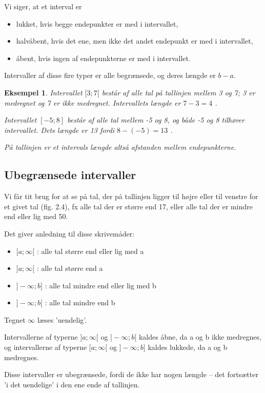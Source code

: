 \documentclass[12pt,oneside,a4paper]{article}
\newtheorem{eks}[thm]{Eksempel}
\begin{document}
Vi siger, at et interval er
\begin{itemize}
    \item lukket, hvis begge endepunkter er med i intervallet,
    \item halvåbent, hvis det ene, men ikke det andet endepunkt er med i intervallet,
    \item åbent, hvis ingen af endepunkterne er med i intervallet.
\end{itemize}
Intervaller af disse fire typer er alle begrænsede, og deres længde er $b-a$.

\begin{eks}
Intervallet $[3;7[$ består af alle tal på tallinjen mellem 3 og 7; 3 er
medregnet og 7 er ikke medregnet. Intervallets længde er $7-3 = 4$ .

Intervallet $[-5;8]$ består af alle tal mellem -5 og 8, og både -5 og 8
tilhører intervallet. Dets længde er 13 fordi $8 - (-5) = 13$ .

På tallinjen er et intervals længde altså afstanden mellem endepunkterne.
\end{eks}

\subsection{Ubegrænsede intervaller}
Vi får tit brug for at se på tal, der på tallinjen ligger til højre eller til
venstre for et givet tal (fig. 2.4), fx alle tal der er større end 17, eller
alle tal der er mindre end eller lig med 50.

Det giver anledning til disse skrivemåder:

\begin{itemize}
    \item $[a;\infty[$  : alle tal større end eller lig med a
    \item $]a;\infty[$  : alle tal større end a
    \item $]-\infty;b]$ : alle tal mindre end eller lig med b
    \item $]-\infty;b[$ : alle tal mindre end b
\end{itemize}
Tegnet $\infty$ læses ’uendelig’.

Intervallerne af typerne $]a;\infty [$ og $]-\infty ;b[$ kaldes åbne, da a og b
ikke medregnes, og intervallerne af typerne $[a;\infty [$ og $]-\infty ;b]$
kaldes lukkede, da a og b medregnes.

Disse intervaller er ubegrænsede, fordi de ikke har nogen længde – det
fortsætter ’i det uendelige’ i den ene ende af tallinjen.
\end{document}
